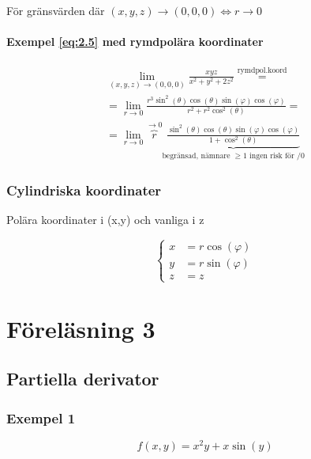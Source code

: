 \documentclass{article}
\begin{document}
För gränsvärden där \((x,y,z) \rightarrow (0,0,0) \iff r \rightarrow 0\)

\newpage
\paragraph{Exempel \eqref{eq:2.5} med rymdpolära koordinater}

\[
\begin{split}
	\lim_{(x,y,z) \rightarrow (0,0,0)} \frac{xyz}{x^2+y^2+2z^2} \overset{\mathrm{rymdpol.koord}}{=} \\
	= \lim_{r \rightarrow 0} \frac{r^3 \sin^2(\theta) \cos(\theta) \sin(\varphi) \cos(\varphi)}{r^2+r^2 \cos^2(\theta)} = \\
	= \lim_{r \rightarrow 0} \overbrace{r}^{\rightarrow 0} \underbrace{\frac{\sin^2(\theta) \cos(\theta) \sin(\varphi) \cos(\varphi)}{1+\cos^2(\theta)}}_\text{begränsad, nämnare \(\geq 1 \) ingen risk för /0}
\end{split}
\]

\subsubsection{Cylindriska koordinater}

Polära koordinater i (x,y) och vanliga i z

\[
\left\{\begin{array}{rcl}
	x & = r \cos(\varphi) \\
	y & = r \sin(\varphi) \\
	z & = z 
\end{array}\right.
\]






\newpage
\section{Föreläsning 3}
\subsection{Partiella derivator}

\subsubsection{Exempel 1}

\begin{equation} \label{eq:3.1}
	f(x,y) = x^2y + x\sin(y)
\end{equation}
\end{document}
